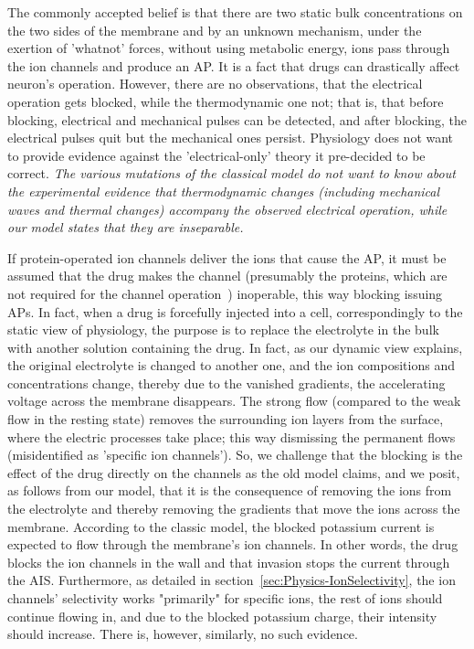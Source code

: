 The commonly accepted belief is that
there are two static bulk concentrations
on the two sides of the membrane and by an unknown mechanism, under the exertion of 'whatnot' forces, without using metabolic energy, ions pass through the ion channels and produce an \gls{AP}.
It is a fact that drugs can drastically affect neuron's  operation. However, there are no observations, that the electrical operation gets blocked, while the thermodynamic one not; that is, that before blocking, electrical and mechanical pulses can be detected, and after blocking, the electrical pulses quit but the mechanical ones persist. Physiology does not want to provide evidence against the 'electrical-only' theory it pre-decided to be correct. \textit{The various mutations of the classical model do not want to know about the experimental evidence that thermodynamic changes (including mechanical waves and thermal changes) accompany the observed electrical operation, while our model states that they are inseparable.} 

If protein-operated ion channels deliver the ions
that cause the \gls{AP}, it must be assumed that the
drug makes the channel (presumably the proteins, which are not required for the channel operation~\cite{HeimburgPhysikOfNerves:2009}) inoperable,
this way blocking issuing \gls{AP}s. 
In fact, when a drug is forcefully injected into a cell, correspondingly to the static view of physiology,
the purpose is to replace
the electrolyte in the bulk with another solution containing the drug. 
In fact, as our dynamic view explains,
the original electrolyte is changed to another one,
and the ion compositions and concentrations change,
thereby due to the vanished gradients, the accelerating voltage across the membrane disappears.
The strong flow (compared to the weak flow
in the resting state) removes
the surrounding ion layers from the surface,
where the electric processes take place; this way dismissing the permanent flows (misidentified as 'specific ion channels').
So, we challenge that the blocking is the effect of the drug
directly on the channels as the old model claims,
and we posit, as follows from our model, that it is the consequence of removing the ions from the electrolyte
and thereby removing the gradients that move the ions across
the membrane.
According to the classic model, the blocked potassium current is expected to flow through the membrane's ion channels.
In other words, the drug blocks the ion channels in the wall
and that invasion stops the current through the \gls{AIS}.
Furthermore, as detailed in section~\ref{sec:Physics-IonSelectivity}, the ion channels' 
selectivity works "primarily" for specific ions,
the rest of ions should continue flowing in, and due to the 
blocked potassium  charge, their intensity should increase.
There is, however, similarly, no such evidence.


